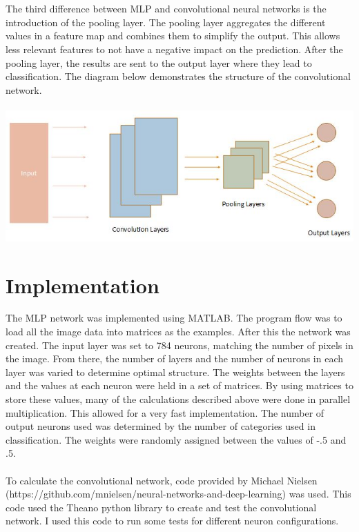 \documentclass[paper=a4, fontsize=11pt]{scrartcl} %
\numberwithin{equation}{section} %
\numberwithin{figure}{section} %
\numberwithin{table}{section} %
\begin{document}
	\\\\
	The third difference between MLP and convolutional neural networks is the introduction of the pooling layer. The pooling layer aggregates the different values in a feature map and combines them to simplify the output. This allows less relevant features to not have a negative impact on the prediction. After the pooling layer, the results are sent to the output layer where they lead to classification. The diagram below demonstrates the structure of the convolutional network. 
	\\\\
	\hspace*{-.1cm}\includegraphics[scale=0.9]{conv}

	\newpage
	\section{Implementation}
	The MLP network was implemented using MATLAB. The program flow was to load all the image data into matrices as the examples. After this the network was created. The input layer was set to 784 neurons, matching the number of pixels in the image. From there, the number of layers and the number of neurons in each layer was varied to determine optimal structure. The weights between the layers and the values at each neuron were held in a set of matrices. By using matrices to store these values, many of the calculations described above were done in parallel multiplication. This allowed for a very fast implementation. The number of output neurons used was determined by the number of categories used in classification. The weights were randomly assigned between the values of -.5 and .5.
	\\\\
	To calculate the convolutional network, code provided by Michael Nielsen (https://github.com/mnielsen/neural-networks-and-deep-learning) was used. This code used the Theano python library to create and test the convolutional network. I used this code to run some tests for different neuron configurations.
	
\end{document}
